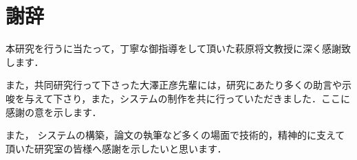 \chapter*{謝辞}

本研究を行うに当たって，丁寧な御指導をして頂いた萩原将文教授に深く感謝致します．

また，共同研究行って下さった大澤正彦先輩には，研究にあたり多くの助言や示唆を与えて下さり，また，システムの制作を共に行っていただきました．ここに感謝の意を示します．

また， システムの構築，論文の執筆など多くの場面で技術的，精神的に支えて頂いた研究室の皆様へ感謝を示したいと思います．